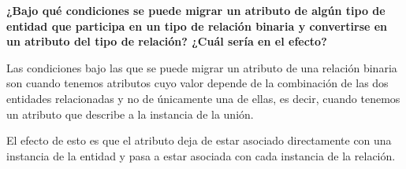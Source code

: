 \item \textbf{¿Bajo qué condiciones se puede migrar un atributo de algún tipo de entidad que participa en un tipo de relación binaria y convertirse en un atributo del tipo de relación? ¿Cuál sería en el efecto?}

Las condiciones bajo las que se puede migrar un atributo de una relación binaria son cuando tenemos atributos cuyo valor depende de la combinación de las dos entidades relacionadas y no de únicamente una de ellas, es decir, cuando tenemos un atributo que describe a la instancia de la unión.

El efecto de esto es que el atributo deja de estar asociado directamente con una instancia de la entidad y pasa a estar asociada con cada instancia de la relación.
